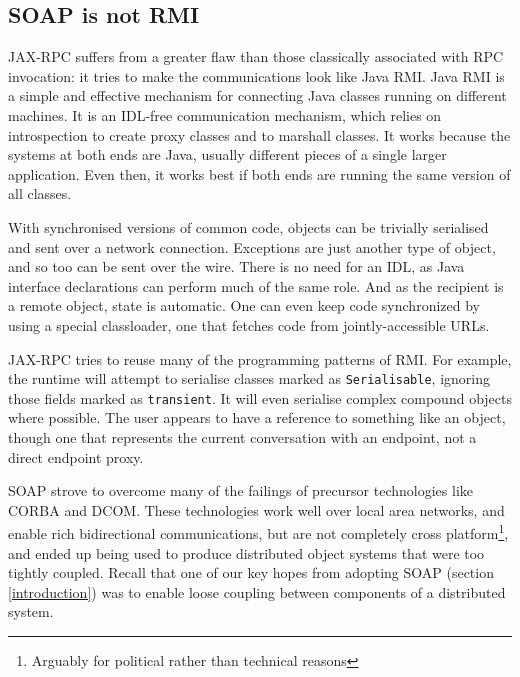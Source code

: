 \subsection{SOAP is not RMI}
\label{objections:soap-not-rmi}

JAX-RPC suffers from a greater flaw than those classically associated
with RPC invocation: it tries to make the communications look like
Java RMI. Java RMI is a simple and effective mechanism for connecting
Java classes running on different machines. It is an IDL-free
communication mechanism, which relies on introspection to create proxy
classes and to marshall classes. It works because the systems at both
ends are Java, usually different pieces of a single larger
application. Even then, it works best if both ends are running the same
version of all classes.

With synchronised versions of common code, objects can be trivially
serialised and sent over a network connection. Exceptions are just
another type of object, and so too can be sent over the wire. There is
no need for an IDL, as Java interface declarations can perform much of
the same role. And as the recipient is a remote object, state is
automatic.  One can even keep code synchronized by using a special
classloader, one that fetches code from jointly-accessible URLs.

JAX-RPC tries to reuse many of the programming patterns of RMI. For
example, the runtime will attempt to serialise classes marked as
{\tt Serialisable}, ignoring those fields marked as
{\tt transient}. It will even serialise complex compound objects where
possible. The user appears to have a reference to something like an
object, though one that represents the current conversation with an
endpoint, not a direct endpoint proxy.


SOAP strove to overcome many of the failings of precursor technologies
like CORBA and DCOM. These technologies work well over local area
networks, and enable rich bidirectional communications, but are not
completely cross platform\footnote{Arguably for political rather than
technical reasons}, and ended up being used to produce distributed
object systems that were too tightly coupled. Recall that one of our
key hopes from adopting SOAP (section \ref{introduction}) was to
enable loose coupling between components of a distributed system.

